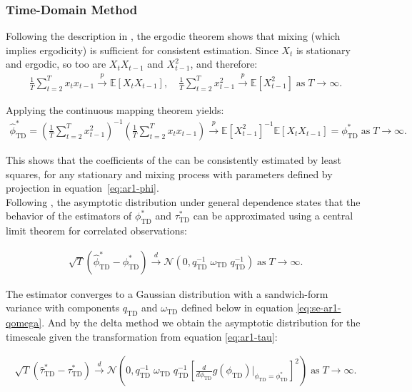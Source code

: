 \documentclass[9pt]{article}
\newcommand{\phitd}{\phi_{\scriptscriptstyle\text{TD}}}
\newcommand{\hatphitd}{\hat{\phi}^*_{\scriptscriptstyle\text{TD}}}
\newcommand{\tautd}{\tau_{\scriptscriptstyle\text{TD}}}
\newcommand{\hattautd}{\hat{\tau}^*_{\scriptscriptstyle\text{TD}}}
\newcommand{\qtd}{q_{\scriptscriptstyle\text{TD}}}
\newcommand{\omegatd}{\omega_{\scriptscriptstyle\text{TD}}}
\begin{document}
\subsubsection{Time-Domain Method}
Following the description in \citet[Theorem~14.29]{hansen_econometrics_2022}, the ergodic theorem shows that mixing (which implies ergodicity) is sufficient for consistent estimation. Since $X_t$ is stationary and ergodic, so too are $X_t X_{t-1}$ and $X_{t-1}^2$, and therefore:
\begin{align}
    \frac{1}{T} \sum_{t=2}^T x_t x_{t-1} \overset{p}{\to} \mathbb{E}[X_t X_{t-1}],\quad
    \frac{1}{T} \sum_{t=2}^T x_{t-1}^2 \overset{p}{\to} \mathbb{E}[X_{t-1}^2] \;\text{as}\;T\to\infty.
\end{align}

\noindent Applying the continuous mapping theorem yields:
\begin{align}
    \hatphitd = \left(\frac{1}{T} \sum_{t=2}^T x_{t-1}^2\right)^{-1} \left( \frac{1}{T} \sum_{t=2}^T x_t x_{t-1}\right) \overset{p}{\to} \mathbb{E}[X_{t-1}^2]^{-1}\mathbb{E}[X_t X_{t-1}] = \phitd^* \;\text{as}\;T\to\infty.
\end{align}

\noindent This shows that the coefficients of the  can be consistently estimated by least squares, for any stationary and mixing process with parameters defined by projection in equation~\eqref{eq:ar1-phi}.\\

Following \citet[Theorem~14.33]{hansen_econometrics_2022}, the asymptotic distribution under general dependence states that the behavior of the estimators of $\phitd^*$ and $\tautd^*$ can be approximated using a central limit theorem for correlated observations:

\begin{align}\label{eq:ar1-phi-clt}
    \sqrt{T}(\hatphitd - \phitd^*) \overset{d}{\to} \mathcal{N}(0, \qtd^{-1}\; \omegatd \; \qtd^{-1})\;\text{as}\;T\to\infty.
\end{align}

\noindent The estimator converges to a Gaussian distribution with a sandwich-form variance with components $\qtd$ and $\omegatd$ defined below in equation \eqref{eq:se-ar1-qomega}. And by the delta method we obtain the asymptotic distribution for the timescale given the transformation from equation \eqref{eq:ar1-tau}:

\begin{align}
    \sqrt{T}(\hattautd - \tautd^*) \overset{d}{\to} \mathcal{N}\left(0, \qtd^{-1}\; \omegatd \; \qtd^{-1} \left[\frac{d}{d\phitd} g(\phitd)\bigg|_{\phitd=\phitd^*}\right]^2\right)\;\text{as}\;T\to\infty.
\end{align}
\end{document}
